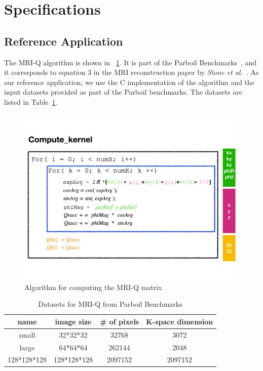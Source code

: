 \section{Specifications}

\subsection{Reference Application}

The MRI-Q algorithm is shown in \figurename~\ref{fig:algo}. It is part of the
Parboil Benchmarks~\cite{stratton2012parboil}, and it corresponds to equation 3
in the MRI reconstruction paper by \emph{Stone et
  al.}~\cite{stone2008accelerating}.
%
As our reference application, we use the C implementation of the algorithm and
the input datasets provided as part of the Parboil benchmarks. The datasets are
listed in Table~\ref{tab:datasets}.


\begin{figure}[t]
\centering
\includegraphics[width=\columnwidth]{figures/algorithm}
\caption{Algorithm for computing the MRI-Q matrix}
\label{fig:algo}
\end{figure}


\begin{table}[t]
\centering
\begin{tabular}{c|c|c|c}
\toprule
\textbf{name} & \textbf{image size} & \textbf{\# of pixels} & \textbf{K-space dimension} \\
\midrule
small       & 32*32*32    & 32768   & 3072    \\
large       & 64*64*64    & 262144  & 2048    \\
128*128*128 & 128*128*128 & 2097152 & 2097152 \\
\bottomrule
\end{tabular}
\caption{Datasets for MRI-Q from Parboil Benchmarks}
\label{tab:datasets}
\end{table}


